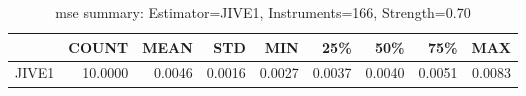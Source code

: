 \begin{table}[ht]
\centering
\caption{mse summary: Estimator=JIVE1, Instruments=166, Strength=0.70}
\begin{tabular}{lrrrrrrrr}
\toprule
 & COUNT & MEAN & STD & MIN & 25\% & 50\% & 75\% & MAX \\
\midrule
JIVE1 & 10.0000 & 0.0046 & 0.0016 & 0.0027 & 0.0037 & 0.0040 & 0.0051 & 0.0083 \\
\bottomrule
\end{tabular}
\end{table}
